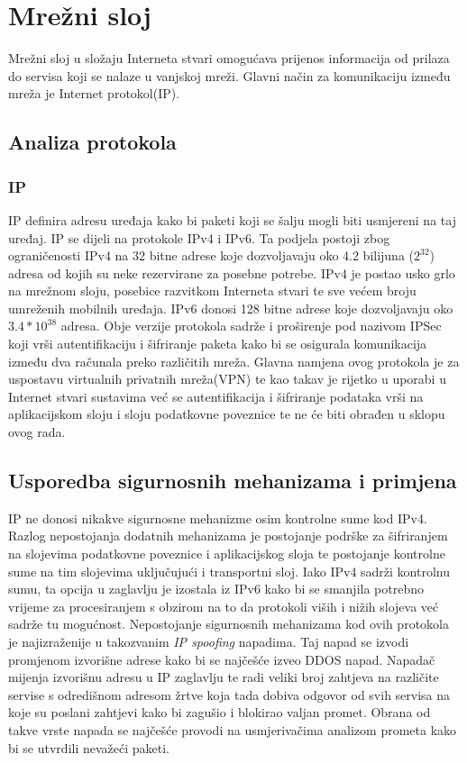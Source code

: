 \documentclass[times, utf8, diplomski]{fer}
\begin{document}
\section{Mrežni sloj}
Mrežni sloj u složaju Interneta stvari omogućava prijenos informacija od prilaza do servisa koji se nalaze u vanjskoj mreži. Glavni način za komunikaciju između mreža je Internet protokol(IP). 

\subsection{Analiza protokola}
\subsubsection{IP}
IP definira adresu uređaja kako bi paketi koji se šalju mogli biti usmjereni na taj uređaj. IP se dijeli na protokole IPv4 i IPv6. Ta podjela postoji zbog ograničenosti IPv4 na 32 bitne adrese koje dozvoljavaju oko 4.2 bilijuna ($2^{32}$) adresa od kojih su neke rezervirane za posebne potrebe. IPv4 je postao usko grlo na mrežnom sloju, posebice razvitkom Interneta stvari te sve većem broju umreženih mobilnih uređaja. IPv6 donosi 128 bitne adrese koje dozvoljavaju oko $3.4*10^{38}$ adresa. Obje verzije protokola sadrže i proširenje pod nazivom IPSec  koji vrši autentifikaciju i šifriranje paketa kako bi se osigurala komunikacija između dva računala preko različitih mreža. Glavna namjena ovog protokola je za uspostavu virtualnih privatnih mreža(VPN) te kao takav je rijetko u uporabi u Internet stvari sustavima već se autentifikacija i šifriranje podataka vrši na aplikacijskom sloju i sloju podatkovne poveznice te ne će biti obrađen u sklopu ovog rada. 

\subsection{Usporedba sigurnosnih mehanizama i primjena}
IP ne donosi nikakve sigurnosne mehanizme osim kontrolne sume kod IPv4. Razlog nepostojanja dodatnih mehanizama je postojanje podrške za šifriranjem na slojevima podatkovne poveznice i aplikacijskog sloja te postojanje kontrolne sume na tim slojevima uključujući i transportni sloj. Iako IPv4 sadrži kontrolnu sumu, ta opcija u zaglavlju je izostala iz IPv6 kako bi se smanjila potrebno vrijeme za procesiranjem s obzirom na to da protokoli viših i nižih slojeva već sadrže tu mogućnost. Nepostojanje sigurnosnih mehanizama kod ovih protokola je najizraženije u takozvanim \emph{IP spoofing} napadima. Taj napad se izvodi promjenom izvorišne adrese kako bi se najčešće izveo DDOS  napad. Napadač mijenja izvorišnu adresu u IP zaglavlju te radi veliki broj zahtjeva na različite servise s odredišnom adresom žrtve koja tada dobiva odgovor od svih servisa na koje su poslani zahtjevi kako bi zagušio i blokirao valjan promet. Obrana od takve vrste napada se najčešće provodi na usmjerivačima analizom prometa kako bi se utvrdili nevažeći paketi. 
\end{document}
